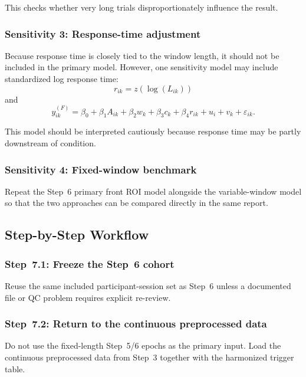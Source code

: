 \documentclass[11pt]{article}
\begin{document}
This checks whether very long trials disproportionately influence the result.

\subsubsection{Sensitivity 3: Response-time adjustment}
Because response time is closely tied to the window length, it should not be included in the primary model.
However, one sensitivity model may include standardized log response time:
\begin{equation}
r_{ik} = z\!\left(\log(L_{ik})\right)
\end{equation}
and
\begin{equation}
y^{(F)}_{ik}
=
\beta_0
+
\beta_1 A_{ik}
+
\beta_2 w_k
+
\beta_3 c_k
+
\beta_4 r_{ik}
+
u_i
+
v_k
+
\varepsilon_{ik}.
\end{equation}

This model should be interpreted cautiously because response time may be partly downstream of condition.

\subsubsection{Sensitivity 4: Fixed-window benchmark}
Repeat the Step~6 primary front ROI model alongside the variable-window model so that the two
approaches can be compared directly in the same report.

\subsection{Step-by-Step Workflow}

\subsubsection{Step~7.1: Freeze the Step~6 cohort}
Reuse the same included participant-session set as Step~6 unless a documented file or QC problem
requires explicit re-review.

\subsubsection{Step~7.2: Return to the continuous preprocessed data}
Do not use the fixed-length Step~5/6 epochs as the primary input.
Load the continuous preprocessed data from Step~3 together with the harmonized trigger table.
\end{document}
